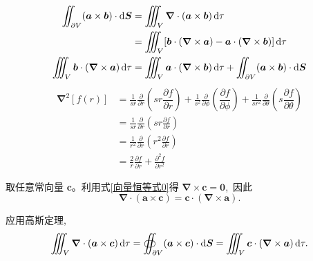 \begin{align*}
    \iint_{\partial V} (\boldsymbol{a}\times\boldsymbol{b}) \cdot \dif \boldsymbol{S}&= \iiint_V \boldsymbol{\nabla} \cdot (\boldsymbol{a}\times\boldsymbol{b})  \dif\tau\\
    &= \iiint_V [\boldsymbol{b}\cdot(\boldsymbol{\nabla}\times\boldsymbol{a})-\boldsymbol{a}\cdot(\boldsymbol{\nabla}\times\boldsymbol{b})]  \dif\tau\\
    \iiint_V \boldsymbol{b}\cdot(\boldsymbol{\nabla}\times\boldsymbol{a})\dif \tau&=\iiint_V \boldsymbol{a}\cdot(\boldsymbol{\nabla}\times\boldsymbol{b})\dif \tau+\iint_{\partial V}(\boldsymbol{a}\times\boldsymbol{b})\cdot\dif \boldsymbol{S}
\end{align*}
\begin{align}
    \boldsymbol{\nabla}^2\left[f(r)\right]&=\frac{1}{sr}\frac{\partial}{\partial r}\left(sr\dfrac{{\partial f}}{\partial r}\right)
    +\frac{1}{s^2}\frac{\partial}{\partial \phi}\left(\dfrac{{\partial f}}{\partial \phi}\right)
    +\frac{1}{sr^2}\frac{\partial}{\partial \theta}\left(s\dfrac{{\partial f}}{\partial \theta}\right)\nonumber\\
    &=\frac{1}{sr}\frac{\partial}{\partial r}\left(sr\frac{\partial f}{\partial r}\right)
    \nonumber\\
    &=\frac{1}{r^2}\frac{\partial}{\partial r}\left(r^2\frac{\partial f}{\partial r}\right)
    \nonumber\\
    &=\frac{2}{r}\frac{\partial f}{\partial r}
    +\frac{\partial^2 f}{\partial r^2}
\end{align}

取任意常向量 $\boldsymbol c$。利用式\ref{向量恒等式0}得
$\boldsymbol\nabla\times\boldsymbol c=\boldsymbol 0$, \,因此
\[
\boldsymbol\nabla\cdot(\boldsymbol a\times\boldsymbol c)
=
\boldsymbol c\cdot(\boldsymbol\nabla\times\boldsymbol a).
\]

应用高斯定理, \,
\[
\iiint_V \boldsymbol\nabla\cdot(\boldsymbol a\times\boldsymbol c)\dif\tau
=
\oiint_{\partial V} (\boldsymbol a\times\boldsymbol c)\cdot \dif \boldsymbol S
=
\iiint_V \boldsymbol c\cdot(\boldsymbol\nabla\times\boldsymbol a)\dif\tau.
\]

